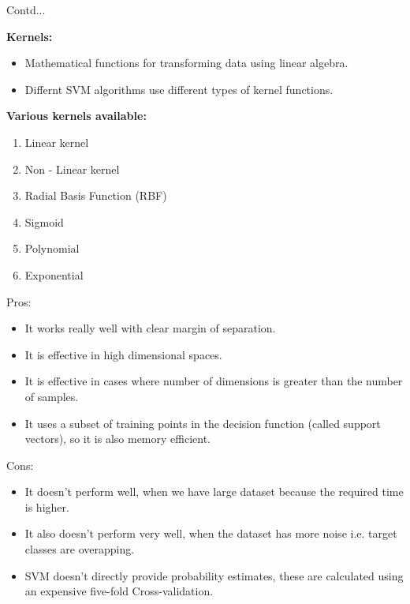 \documentclass{beamer}
\newcommand\myheading[1]{%
  \par\bigskip
  {\large\bfseries#1}\par\smallskip}
\begin{document}
\begin{frame}{Contd...}
	\begin{flushleft}
		\myheading{Kernels:}
		\begin{itemize}
			\item Mathematical functions for transforming data using linear algebra.
			\item Differnt SVM algorithms use different types of kernel functions.
		\end{itemize}
		\myheading{Various kernels available:}
		\begin{enumerate}
			\item Linear kernel
			\item Non - Linear kernel
			\item Radial Basis Function (RBF)
			\item Sigmoid
			\item Polynomial
			\item Exponential
		\end{enumerate}
	\end{flushleft}
\end{frame}

\begin{frame}{Pros:}
	\begin{itemize}
		\item It works really well with clear margin of separation.
		\item It is effective in high dimensional spaces.
		\item It is effective in cases where number of dimensions is greater than the number of samples.
		\item It uses a subset of training points in the decision function (called support vectors), so it is also memory efficient.
	\end{itemize}
\end{frame}

\begin{frame}{Cons:}
	\begin{itemize}
		\item It doesn't perform well, when we have large dataset because the required time is higher.
		\item It also doesn't perform very well, when the dataset has more noise i.e. target classes are overapping.
		\item SVM doesn't directly provide probability estimates, these are calculated using an expensive five-fold Cross-validation.
	\end{itemize}
\end{frame}
\end{document}
